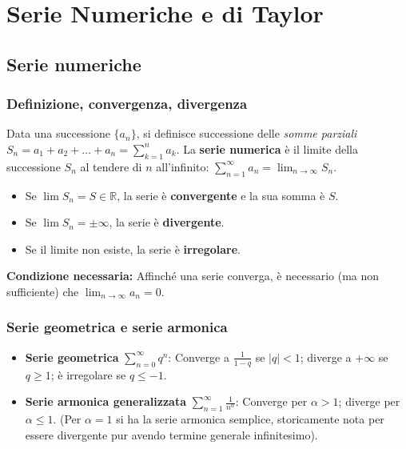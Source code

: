 \section{Serie Numeriche e di Taylor}
\subsection{Serie numeriche}
\subsubsection{Definizione, convergenza, divergenza}
Data una successione $\{a_n\}$, si definisce successione delle \textit{somme parziali} $S_n = a_1 + a_2 + \dots + a_n = \sum_{k=1}^n a_k$. 
La \textbf{serie numerica} è il limite della successione $S_n$ al tendere di $n$ all'infinito: $\sum_{n=1}^\infty a_n = \lim_{n \to \infty} S_n$.
\begin{itemize}
    \item Se $\lim S_n = S \in \mathbb{R}$, la serie è \textbf{convergente} e la sua somma è $S$.
    \item Se $\lim S_n = \pm\infty$, la serie è \textbf{divergente}.
    \item Se il limite non esiste, la serie è \textbf{irregolare}.
\end{itemize}
\textbf{Condizione necessaria:} Affinché una serie converga, è necessario (ma non sufficiente) che $\lim_{n \to \infty} a_n = 0$.

\subsubsection{Serie geometrica e serie armonica}
\begin{itemize}
    \item \textbf{Serie geometrica} $\sum_{n=0}^\infty q^n$: Converge a $\frac{1}{1-q}$ se $|q| < 1$; diverge a $+\infty$ se $q \ge 1$; è irregolare se $q \le -1$.
    \item \textbf{Serie armonica generalizzata} $\sum_{n=1}^\infty \frac{1}{n^\alpha}$: Converge per $\alpha > 1$; diverge per $\alpha \le 1$. (Per $\alpha=1$ si ha la serie armonica semplice, storicamente nota per essere divergente pur avendo termine generale infinitesimo).
\end{itemize}

